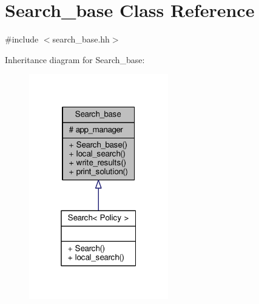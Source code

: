 \hypertarget{classSearch__base}{\section{Search\-\_\-base Class Reference}
\label{classSearch__base}
}


{\ttfamily \#include $<$search\-\_\-base.\-hh$>$}



Inheritance diagram for Search\-\_\-base\-:\nopagebreak
\begin{figure}[H]
\begin{center}
\leavevmode
\includegraphics[width=172pt]{classSearch__base__inherit__graph}
\end{center}
\end{figure}



